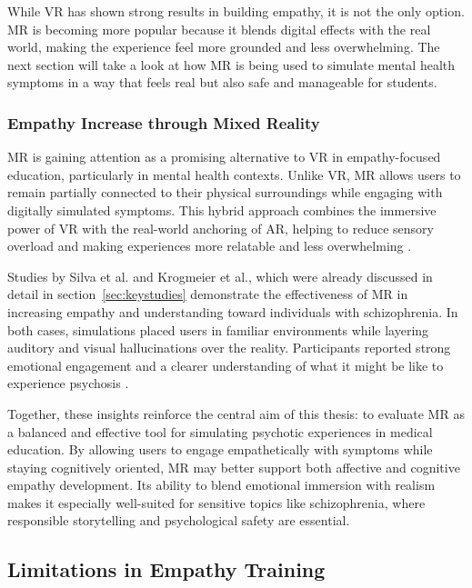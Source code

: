\vspace{1em}

While VR has shown strong results in building empathy, it is not the only option. MR is becoming more popular because it blends digital effects with the real world, making the experience feel more grounded and less overwhelming. The next section will take a look at how MR is being used to simulate mental health symptoms in a way that feels real but also safe and manageable for students.

\subsubsection{Empathy Increase through Mixed Reality}

MR is gaining attention as a promising alternative to VR in empathy-focused education, particularly in mental health contexts. Unlike VR, MR allows users to remain partially connected to their physical surroundings while engaging with digitally simulated symptoms. This hybrid approach combines the immersive power of VR with the real-world anchoring of AR, helping to reduce sensory overload and making experiences more relatable and less overwhelming \cite{Zare-Bidaki2022}.

Studies by Silva et al. and Krogmeier et al., which were already discussed in detail in section~\ref{sec:keystudies} demonstrate the effectiveness of MR in increasing empathy and understanding toward individuals with schizophrenia. In both cases, simulations placed users in familiar environments while layering auditory and visual hallucinations over the reality. Participants reported strong emotional engagement and a clearer understanding of what it might be like to experience psychosis \cite{Silva2017, Krogmeier2024}. 

\vspace{1em}

Together, these insights reinforce the central aim of this thesis: to evaluate MR as a balanced and effective tool for simulating psychotic experiences in medical education. By allowing users to engage empathetically with symptoms while staying cognitively oriented, MR may better support both affective and cognitive empathy development. Its ability to blend emotional immersion with realism makes it especially well-suited for sensitive topics like schizophrenia, where responsible storytelling and psychological safety are essential.

\subsection{Limitations in Empathy Training}
\label{sec:limitationsempathytraining}

